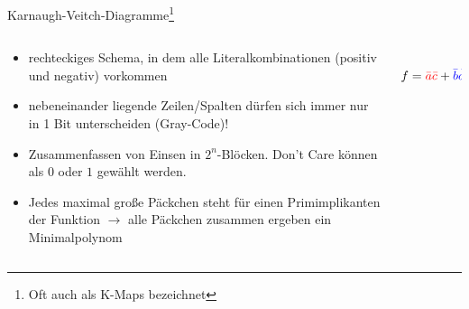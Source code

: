 \documentclass[
  german,            %
  aspectratio=169,    %
]{tumbeamer}
\begin{document}
\begin{frame}[fragile, c]{Karnaugh-Veitch-Diagramme\footnote{Oft auch als K-Maps bezeichnet}}{}
\begin{columns}[c]
\begin{column}{0.6\textwidth}
	\begin{itemize}
		\item rechteckiges Schema, in dem alle Literalkombinationen (positiv und negativ) vorkommen
		\item nebeneinander liegende Zeilen/Spalten dürfen sich immer nur in 1 Bit unterscheiden (Gray-Code)!
		\item Zusammenfassen von Einsen in $2^n$-Blöcken. Don't Care können als $0$ oder $1$ gewählt werden.
		\item Jedes maximal große Päckchen steht für einen Primimplikanten der Funktion $\rightarrow$ alle Päckchen zusammen ergeben ein Minimalpolynom

	\end{itemize}
\end{column}
\begin{column}{0.4\textwidth}
\begin{center}
\\
$f=\textcolor{red}{\bar a\bar c}+\textcolor{blue}{\bar b\bar d}+\textcolor{lime}{ac} +\textcolor{orange}{\bar abd}$
\end{center}
\end{column}
\end{columns}

\end{frame}
\end{document}
